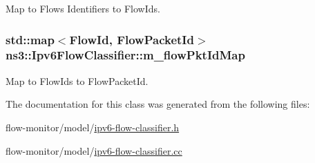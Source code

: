 Map to Flows Identifiers to Flow\+Ids. 

\subsubsection[{\texorpdfstring{m\+\_\+flow\+Pkt\+Id\+Map}{m_flowPktIdMap}}]{\setlength{\rightskip}{0pt plus 5cm}std\+::map$<${\bf Flow\+Id}, {\bf Flow\+Packet\+Id}$>$ ns3\+::\+Ipv6\+Flow\+Classifier\+::m\+\_\+flow\+Pkt\+Id\+Map\hspace{0.3cm}{\ttfamily [private]}}\hypertarget{classns3_1_1Ipv6FlowClassifier_adfa0df24172af71f377bc0b56456e1ae}{}\label{classns3_1_1Ipv6FlowClassifier_adfa0df24172af71f377bc0b56456e1ae}


Map to Flow\+Ids to Flow\+Packet\+Id. 



The documentation for this class was generated from the following files\+:\begin{DoxyCompactItemize}
\item 
flow-\/monitor/model/\hyperlink{ipv6-flow-classifier_8h}{ipv6-\/flow-\/classifier.\+h}\item 
flow-\/monitor/model/\hyperlink{ipv6-flow-classifier_8cc}{ipv6-\/flow-\/classifier.\+cc}\end{DoxyCompactItemize}

